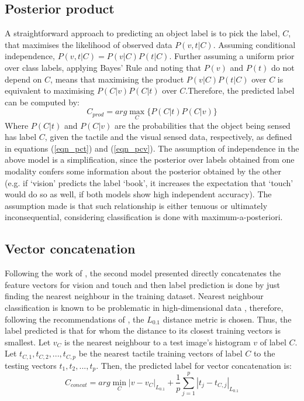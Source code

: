 \documentclass[9pt,technote]{IEEEtran}  %
\begin{document}
\subsection{Posterior product}
A straightforward approach to predicting an object label is to pick the label, $C$, that maximises the likelihood of observed data $P(v,t|C)$. Assuming conditional independence, $P(v,t|C) = P(v|C)P(t|C)$. Further assuming a uniform prior over class labels, applying Bayes' Rule and noting that $P(v)$ and $P(t)$ do not depend on $C$, means that maximising the product $P(v|C)P(t|C)$ over $C$ is equivalent to maximising $P(C|v)P(C|t)$ over $C$.Therefore, the predicted label can be computed by: 
\begin{equation}
C_{prod} = arg\max_C\{P(C|t)P(C|v)\}
\label{eqn_cprod}
\end{equation}
Where $P(C|t)$ and $P(C|v)$ are the probabilities that the object being sensed has label $C$, given the tactile and the visual sensed data, respectively, as defined in equations (\ref{eqn_pct}) and (\ref{eqn_pcv}).
The assumption of independence in the above model is a simplification, since the posterior over labels obtained from one modality confers some information about the posterior obtained by the other (e.g. if `vision' predicts the label `book', it increases the expectation that `touch' would do so as well, if both models show high independent accuracy). The assumption made is that such relationship is either tenuous or ultimately inconsequential, considering classification is done with maximum-a-posteriori.
\subsection{Vector concatenation}
Following the work of \cite{Yang2015}, the second model presented directly concatenates the feature vectors for vision and touch and then label prediction is done by just finding the nearest neighbour in the training dataset. Nearest neighbour classification is known to be problematic in high-dimensional data \cite{Aggarwal2001}, therefore, following the recommendations of \cite{Aggarwal2001}, the $L_{0.1}$ distance metric is chosen. Thus, the label predicted is that for whom the distance to its closest training vectors is smallest. Let $v_C$ is the nearest neighbour to a test image's histogram $v$ of label $C$. Let $t_{C,1}, t_{C,2}, ..., t_{C,p}$ be the nearest tactile training vectors of label $C$ to the testing vectors $t_1, t_2, ..., t_p$. Then, the predicted label for vector concatenation is:
\begin{equation}
C_{concat} = arg\min_C |v - v_C|_{L_{0.1}} + \frac{1}{p}\sum_{j=1}^{p}|t_j - t_{C,j}|_{L_{0.1}}
\label{eqn_cconcat}
\end{equation}
\end{document}
